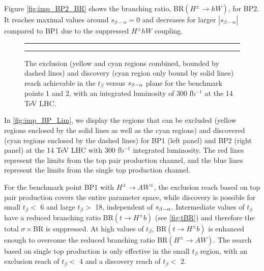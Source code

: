 Figure \ref{fig:imp_BP2_BR} shows the branching ratio, BR$(H^{\pm} \rightarrow hW)$, for BP2. It reaches maximal values around $s_{\beta-\alpha}=0$ and decreases for larger $|s_{\beta-\alpha}|$ compared to BP1 due to the suppressed $H^{\pm} hW$ coupling. 

\begin{figure}
 \centering
 \hrule
 \vspace{\onelineskip}
 \caption{The exclusion (yellow and cyan regions combined, bounded by dashed lines) and discovery (cyan region only bound by solid lines) reach achievable in the $t_{\beta}$ versus $s_{\beta-\alpha}$ plane for the benchmark points 1 and 2, with an integrated luminosity of 300 fb$^{-1}$ at the 14 TeV LHC.}
\label{fig:imp_BP_Lim}
 \vspace{\onelineskip}
\hrule
\end{figure}

In \autoref{fig:imp_BP_Lim}, we display the regions that can be excluded (yellow regions enclosed by the solid lines as well as the cyan regions) and discovered (cyan regions enclosed by the dashed lines) for BP1 (left panel) and BP2 (right panel) at the 14 TeV LHC with 300 fb$^{-1}$ integrated luminosity. The red lines represent the limits from the top pair production channel, and the blue lines represent the limits from the single top production channel.

For the benchmark point BP1 with $H^{\pm} \rightarrow AW^{\pm}$, the exclusion reach based on top pair production covers the entire parameter space, while discovery is possible for small $t_{\beta}<$ 6 and large $t_{\beta}>$ 18, independent of $s_{\beta-\alpha}$. Intermediate values of $t_{\beta}$ have a reduced branching ratio BR$(t \rightarrow H^{\pm} b)$ (see \autoref{fig:tBR}) and therefore the total $\sigma\times$BR is suppressed. At high values of $t_{\beta}$, BR$(t \rightarrow H^{\pm}b)$ is enhanced enough to overcome the reduced branching ratio BR$(H^{\pm} \rightarrow AW)$. The search based on single top production is only effective in the small $t_{\beta}$ region, with an exclusion reach of $t_{\beta} <$ 4 and a discovery reach of $t_{\beta}<$ 2. 

